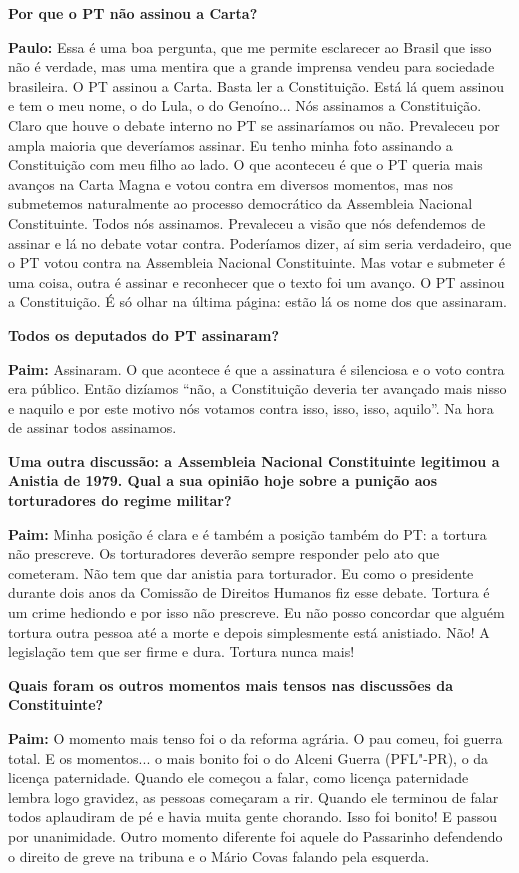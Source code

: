\textbf{Por que o PT não assinou a Carta?}

\textbf{Paulo:} Essa é uma boa pergunta, que me permite esclarecer ao
Brasil que isso não é verdade, mas uma mentira que a grande imprensa
vendeu para sociedade brasileira. O PT assinou a Carta. Basta ler a
Constituição. Está lá quem assinou e tem o meu nome, o do Lula, o do
Genoíno... Nós assinamos a Constituição. Claro que houve o debate
interno no PT se assinaríamos ou não. Prevaleceu por ampla maioria que
deveríamos assinar. Eu tenho minha foto assinando a Constituição com meu
filho ao lado. O que aconteceu é que o PT queria mais avanços na Carta
Magna e votou contra em diversos momentos, mas nos submetemos
naturalmente ao processo democrático da Assembleia Nacional
Constituinte. Todos nós assinamos. Prevaleceu a visão que nós defendemos
de assinar e lá no debate votar contra. Poderíamos dizer, aí sim seria
verdadeiro, que o PT votou contra na Assembleia Nacional Constituinte.
Mas votar e submeter é uma coisa, outra é assinar e reconhecer que o
texto foi um avanço. O PT assinou a Constituição. É só olhar na última
página: estão lá os nome dos que assinaram.

\textbf{Todos os deputados do PT assinaram?}

\textbf{Paim:} Assinaram. O que acontece é que a assinatura é silenciosa
e o voto contra era público. Então dizíamos ``não, a Constituição
deveria ter avançado mais nisso e naquilo e por este motivo nós votamos
contra isso, isso, isso, aquilo''. Na hora de assinar todos assinamos.

\textbf{Uma outra discussão: a Assembleia Nacional Constituinte
legitimou a Anistia de 1979. Qual a sua opinião hoje sobre a punição aos
torturadores do regime militar?}

\textbf{Paim:} Minha posição é clara e é também a posição também do PT:
a tortura não prescreve. Os torturadores deverão sempre responder pelo
ato que cometeram. Não tem que dar anistia para torturador. Eu como o
presidente durante dois anos da Comissão de Direitos Humanos fiz esse
debate. Tortura é um crime hediondo e por isso não prescreve. Eu não
posso concordar que alguém tortura outra pessoa até a morte e depois
simplesmente está anistiado. Não! A legislação tem que ser firme e dura.
Tortura nunca mais!

\textbf{Quais foram os outros momentos mais tensos nas discussões da
Constituinte?}

\textbf{Paim:} O momento mais tenso foi o da reforma agrária. O pau
comeu, foi guerra total. E os momentos... o mais bonito foi o do Alceni
Guerra (PFL"-PR), o da licença paternidade. Quando ele começou a falar,
como licença paternidade lembra logo gravidez, as pessoas começaram a
rir. Quando ele terminou de falar todos aplaudiram de pé e havia muita
gente chorando. Isso foi bonito! E passou por unanimidade. Outro momento
diferente foi aquele do Passarinho defendendo o direito de greve na
tribuna e o Mário Covas falando pela esquerda.

